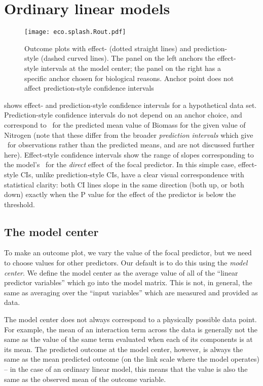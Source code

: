 
\section{Ordinary linear models}

\begin{figure}
\begin{center}
\texttt{[image: eco.splash.Rout.pdf]}
\end{center}
\caption{Outcome plots with effect- (dotted straight lines) and prediction-style (dashed curved lines). The panel on the left anchors the effect-style intervals at the model center; the panel on the right has a specific anchor chosen for biological reasons. Anchor point does not affect prediction-style confidence intervals}
\end{figure}

 shows effect- and prediction-style confidence intervals for a hypothetical data set. Prediction-style confidence intervals do not depend on an anchor choice, and correspond to \CIs\ for the predicted mean value of Biomass for the given value of Nitrogen (note that these differ from the broader \emph{prediction intervals} which give \CIs\ for observations rather than the predicted means, and are not discussed further here). Effect-style confidence intervals show the range of slopes corresponding to the model's \CIs\ for the \emph{direct} effect of the focal predictor. In this simple case, effect-style CIs, unlike prediction-style CIs, have a clear visual correspondence with statistical clarity: both CI lines slope in the same direction (both up, or both down) exactly when the P value for the effect of the predictor is below the threshold.

\subsection{The model center}

To make an outcome plot, we vary the value of the focal predictor, but we need to choose values for other predictors. Our default is to do this using the \emph{model center}. We define the model center as the average value of all of the “linear predictor variables” which go into the model matrix. This is not, in general, the same as averaging over the “input variables” which are measured and provided as data. 

The model center does not always correspond to a physically possible data point. For example, the mean of an interaction term across the data is generally not the same as the value of the same term evaluated when each of its components is at its mean. The predicted outcome at the model center, however, is always the same as the mean predicted outcome (on the link scale where the model operates) -- in the case of an ordinary linear model, this means that the value is also the same as the observed mean of the outcome variable.

